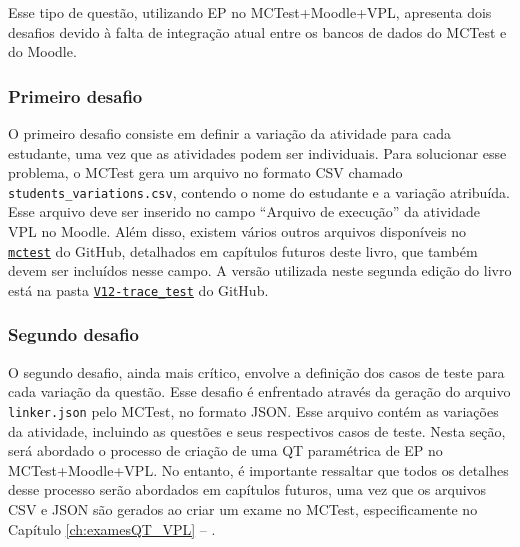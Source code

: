 Esse tipo de questão, utilizando EP no MCTest+Moodle+VPL, apresenta dois desafios devido à falta de integração atual entre os bancos de dados do MCTest e do Moodle.

\subsubsection{Primeiro desafio}

O primeiro desafio consiste em definir a variação da atividade para cada estudante, uma vez que as atividades podem ser individuais. Para solucionar esse problema, o MCTest gera um arquivo no formato CSV chamado \verb|students_variations.csv|, contendo o nome do estudante e a variação atribuída. Esse arquivo deve ser inserido no campo ``Arquivo de execução'' da atividade VPL no Moodle. Além disso, existem vários outros arquivos disponíveis no \href{https://github.com/fzampirolli/mctest}{\texttt{mctest}} do GitHub, detalhados em capítulos futuros deste livro, que também devem ser incluídos nesse campo. A versão utilizada neste segunda edição do livro está na pasta \href{https://github.com/fzampirolli/mctest/tree/master/VPL_modification/V12-trace_test}{\texttt{V12-trace\_test}} do GitHub.


\subsubsection{Segundo desafio}

O segundo desafio, ainda mais crítico, envolve a definição dos casos de teste para cada variação da questão. Esse desafio é enfrentado através da geração do arquivo \verb|linker.json| pelo MCTest, no formato JSON. Esse arquivo contém as variações da atividade, incluindo as questões e seus respectivos casos de teste. Nesta seção, será abordado o processo de criação de uma QT paramétrica de EP no MCTest+Moodle+VPL. No entanto, é importante ressaltar que todos os detalhes desse processo serão abordados em capítulos futuros, uma vez que os arquivos CSV e JSON são gerados ao criar um exame no MCTest, especificamente no Capítulo \ref{ch:examesQT_VPL} -- .

